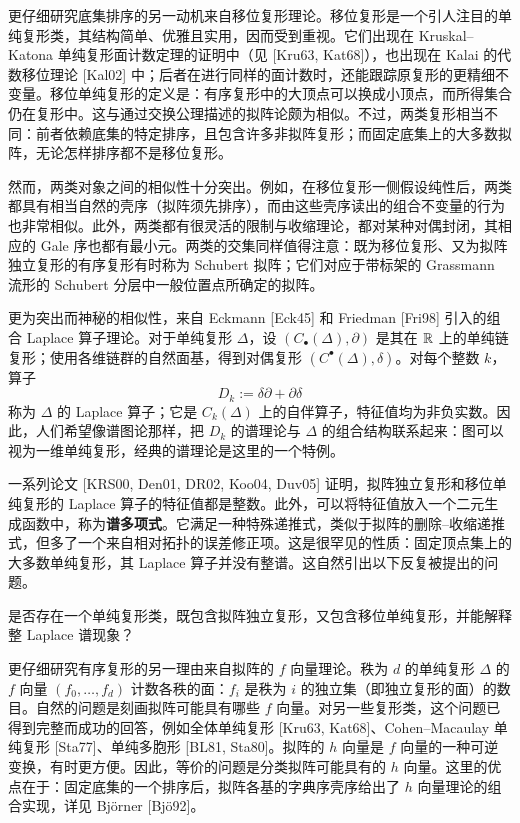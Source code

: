 更仔细研究底集排序的另一动机来自移位复形理论。移位复形是一个引人注目的单纯复形类，其结构简单、优雅且实用，因而受到重视。它们出现在 Kruskal--Katona 单纯复形面计数定理的证明中（见 [Kru63, Kat68]），也出现在 Kalai 的代数移位理论 [Kal02] 中；后者在进行同样的面计数时，还能跟踪原复形的更精细不变量。移位单纯复形的定义是：有序复形中的大顶点可以换成小顶点，而所得集合仍在复形中。这与通过交换公理描述的拟阵论颇为相似。不过，两类复形相当不同：前者依赖底集的特定排序，且包含许多非拟阵复形；而固定底集上的大多数拟阵，无论怎样排序都不是移位复形。

然而，两类对象之间的相似性十分突出。例如，在移位复形一侧假设纯性后，两类都具有相当自然的壳序（拟阵须先排序），而由这些壳序读出的组合不变量的行为也非常相似。此外，两类都有很灵活的限制与收缩理论，都对某种对偶封闭，其相应的 Gale 序也都有最小元。两类的交集同样值得注意：既为移位复形、又为拟阵独立复形的有序复形有时称为 Schubert 拟阵；它们对应于带标架的 Grassmann 流形的 Schubert 分层中一般位置点所确定的拟阵。

更为突出而神秘的相似性，来自 Eckmann [Eck45] 和 Friedman [Fri98] 引入的组合 Laplace 算子理论。对于单纯复形 $\Delta$，设 $(C_\bullet(\Delta),\partial)$ 是其在 $\mathbb R$ 上的单纯链复形；使用各维链群的自然面基，得到对偶复形 $(C^\bullet(\Delta),\delta)$。对每个整数 $k$，算子
\[
D_k:=\delta\partial+\partial\delta
\]
称为 $\Delta$ 的 Laplace 算子；它是 $C_k(\Delta)$ 上的自伴算子，特征值均为非负实数。因此，人们希望像谱图论那样，把 $D_k$ 的谱理论与 $\Delta$ 的组合结构联系起来：图可以视为一维单纯复形，经典的谱理论是这里的一个特例。

一系列论文 [KRS00, Den01, DR02, Koo04, Duv05] 证明，拟阵独立复形和移位单纯复形的 Laplace 算子的特征值都是整数。此外，可以将特征值放入一个二元生成函数中，称为\textbf{谱多项式}。它满足一种特殊递推式，类似于拟阵的删除--收缩递推式，但多了一个来自相对拓扑的误差修正项。这是很罕见的性质：固定顶点集上的大多数单纯复形，其 Laplace 算子并没有整谱。这自然引出以下反复被提出的问题。

是否存在一个单纯复形类，既包含拟阵独立复形，又包含移位单纯复形，并能解释整 Laplace 谱现象？

更仔细研究有序复形的另一理由来自拟阵的 $f$ 向量理论。秩为 $d$ 的单纯复形 $\Delta$ 的 $f$ 向量 $(f_0,\ldots,f_d)$ 计数各秩的面：$f_i$ 是秩为 $i$ 的独立集（即独立复形的面）的数目。自然的问题是刻画拟阵可能具有哪些 $f$ 向量。对另一些复形类，这个问题已得到完整而成功的回答，例如全体单纯复形 [Kru63, Kat68]、Cohen--Macaulay 单纯复形 [Sta77]、单纯多胞形 [BL81, Sta80]。拟阵的 $h$ 向量是 $f$ 向量的一种可逆变换，有时更方便。因此，等价的问题是分类拟阵可能具有的 $h$ 向量。这里的优点在于：固定底集的一个排序后，拟阵各基的字典序壳序给出了 $h$ 向量理论的组合实现，详见 Björner [Bjö92]。

